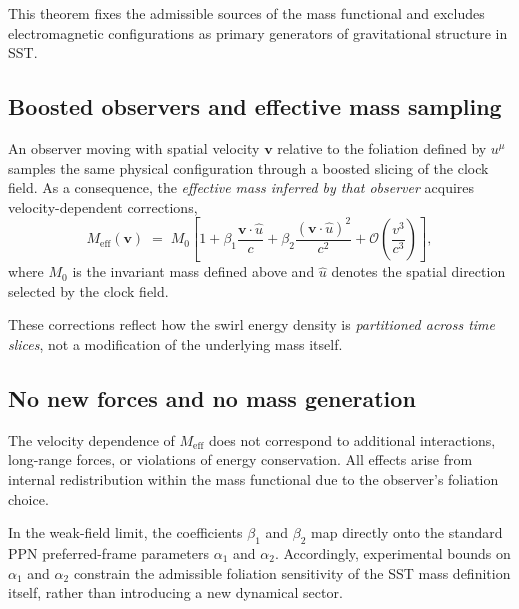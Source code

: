 \documentclass[10pt]{article}
\begin{document}
        This theorem fixes the admissible sources of the mass functional
        and excludes electromagnetic configurations as primary generators
        of gravitational structure in SST.

    \subsection{Boosted observers and effective mass sampling}

        An observer moving with spatial velocity $\mathbf{v}$ relative to the
        foliation defined by $u^\mu$ samples the same physical configuration
        through a boosted slicing of the clock field.
        As a consequence, the \emph{effective mass inferred by that observer}
        acquires velocity-dependent corrections,
        \begin{equation}
            M_{\mathrm{eff}}(\mathbf{v})
            \;=\;
            M_0
            \left[
                1
                + \beta_1 \frac{\mathbf{v}\!\cdot\!\hat{u}}{c}
                + \beta_2 \frac{(\mathbf{v}\!\cdot\!\hat{u})^2}{c^2}
                + \mathcal{O}\!\left(\frac{v^3}{c^3}\right)
            \right] ,
        \end{equation}
        where $M_0$ is the invariant mass defined above and $\hat{u}$ denotes
        the spatial direction selected by the clock field.

        These corrections reflect how the swirl energy density is
        \emph{partitioned across time slices}, not a modification of the
        underlying mass itself.

    \subsection{No new forces and no mass generation}

        The velocity dependence of $M_{\mathrm{eff}}$ does not correspond to
        additional interactions, long-range forces, or violations of energy
        conservation.
        All effects arise from internal redistribution within the mass
        functional due to the observer's foliation choice.

        In the weak-field limit, the coefficients $\beta_1$ and $\beta_2$
        map directly onto the standard PPN preferred-frame parameters
        $\alpha_1$ and $\alpha_2$.
        Accordingly, experimental bounds on $\alpha_1$ and $\alpha_2$
        constrain the admissible foliation sensitivity of the SST mass
        definition itself, rather than introducing a new dynamical sector.
\end{document}
